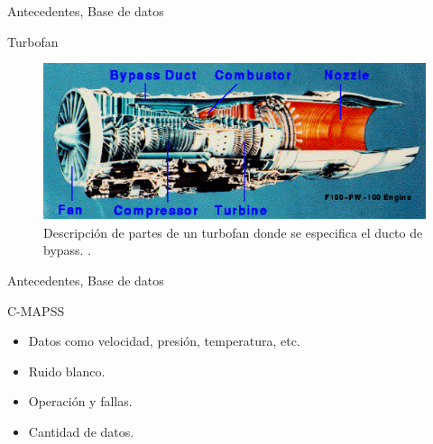 \begin{frame}{Antecedentes, Base de datos}
\begin{block}{Turbofan}

\begin{figure}[!h]
		\centering
		\includegraphics[scale=0.5]{animate/turbofan31.png}
		\caption{Descripción de partes de un turbofan donde se especifica el ducto de bypass. \cite{bypass_nasa}. }
		\label{logofcfm}
	\end{figure}
\end{block}
\end{frame}


\begin{frame}{Antecedentes, Base de datos}
\begin{block}{C-MAPSS \cite{metricas-rmse}}
\begin {itemize}
    \item Datos como velocidad, presión, temperatura, etc.
    \pause
    \item Ruido blanco.
    \pause
    \item Operación y fallas.
    \pause
    \item Cantidad de datos.
\end {itemize}
\end{block}
\end{frame}

